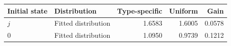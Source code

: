 \begin{tabular}{llrrr}\toprule
Initial state & Distribution & Type-specific & Uniform & Gain\\\midrule
$j$ & Fitted distribution & 1.6583 & 1.6005 & 0.0578 \\
$0$ & Fitted distribution & 1.0950 & 0.9739 & 0.1212 \\
\bottomrule\end{tabular}
